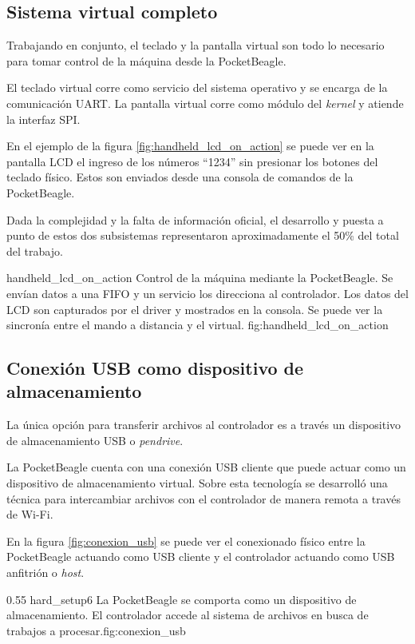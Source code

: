 \subsection{Sistema virtual completo}
      Trabajando en conjunto, el teclado y la pantalla virtual son todo lo necesario para tomar control de la máquina desde la PocketBeagle.\par
      El teclado virtual corre como servicio del sistema operativo y se encarga de la comunicación UART. La pantalla virtual corre como módulo del \textit{kernel} y atiende la interfaz SPI.\par

      En el ejemplo de la figura \ref{fig:handheld_lcd_on_action} se puede ver en la pantalla LCD el ingreso de los números ``1234'' sin presionar los botones del teclado físico. Estos son enviados desde una consola de comandos de la PocketBeagle.\par
      Dada la complejidad y la falta de información oficial, el desarrollo y puesta a punto de estos dos subsistemas representaron aproximadamente el 50\% del total del trabajo.\par

         {handheld_lcd_on_action}
         {Control de la máquina mediante la PocketBeagle. Se envían datos a una FIFO y un servicio los direcciona al controlador. Los datos del LCD son capturados por el driver y mostrados en la consola. Se puede ver la sincronía entre el mando a distancia y el virtual.}
         {fig:handheld_lcd_on_action}


\subsection{Conexión USB como dispositivo de almacenamiento}
\label{subsection:usb_mass}
La única opción para transferir archivos al controlador es a través un dispositivo de almacenamiento USB o \textit{pendrive}.\par
   La PocketBeagle cuenta con una conexión USB cliente que puede actuar como un dispositivo de almacenamiento virtual.
   Sobre esta tecnología se desarrolló una técnica para intercambiar archivos con el controlador de manera remota a través de Wi-Fi.\par
   En la figura \ref{fig:conexion_usb} se puede ver el conexionado físico entre la PocketBeagle actuando como USB cliente y el controlador actuando como USB anfitrión o \textit{host}.

\subfiga 
   {0.55} {hard_setup6} {La PocketBeagle se comporta como un dispositivo de almacenamiento. El controlador accede al sistema de archivos en busca de trabajos a procesar.}{fig:conexion_usb}

